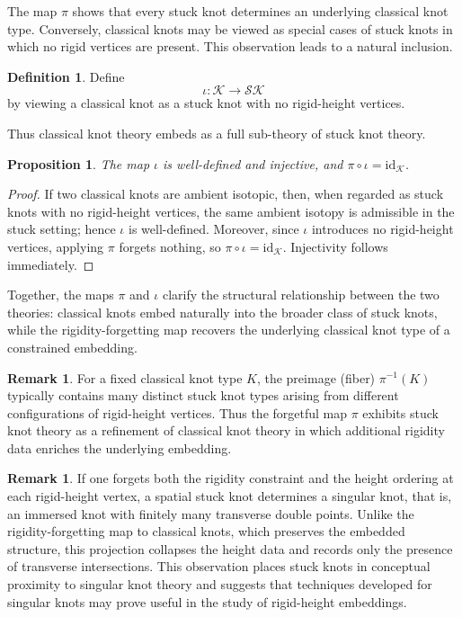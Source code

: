 \documentclass[11pt,a4paper]{article}
\theoremstyle{plain}
\newtheorem{proposition}[theorem]{Proposition}
\theoremstyle{definition}
\newtheorem{definition}[theorem]{Definition}
\newtheorem{remark}[theorem]{Remark}
\begin{document}
The map $\pi$ shows that every stuck knot determines an underlying classical knot type. Conversely, classical knots may be viewed as special cases of stuck knots in which no rigid vertices are present. This observation leads to a natural inclusion.


\begin{definition}
Define
\[
\iota:\mathcal{K}\to\mathcal{SK}
\]
by viewing a classical knot as a stuck knot with no rigid-height vertices.
\end{definition}

Thus classical knot theory embeds as a full sub-theory of stuck knot theory.

\begin{proposition}
The map $\iota$ is well-defined and injective, and $\pi\circ\iota=\mathrm{id}_{\mathcal{K}}$.
\end{proposition}

\begin{proof}
If two classical knots are ambient isotopic, then, when regarded as stuck knots with no rigid-height vertices, the same ambient isotopy is admissible in the stuck setting; hence $\iota$ is well-defined. Moreover, since $\iota$ introduces no rigid-height vertices, applying $\pi$ forgets nothing, so $\pi\circ\iota=\mathrm{id}_{\mathcal{K}}$. Injectivity follows immediately.
\end{proof}

Together, the maps $\pi$ and $\iota$ clarify the structural relationship between the two theories: classical knots embed naturally into the broader class of stuck knots, while the rigidity-forgetting map recovers the underlying classical knot type of a constrained embedding.


\begin{remark}
For a fixed classical knot type $K$, the preimage (fiber) $\pi^{-1}(K)$ typically contains many distinct stuck knot types arising from different configurations of rigid-height vertices. Thus the forgetful map $\pi$ exhibits stuck knot theory as a refinement of classical knot theory in which additional rigidity data enriches the underlying embedding.
\end{remark}


\begin{remark}
If one forgets both the rigidity constraint and the height ordering at each rigid-height vertex, a spatial stuck knot determines a singular knot, that is, an immersed knot with finitely many transverse double points. Unlike the rigidity-forgetting map to classical knots, which preserves the embedded structure, this projection collapses the height data and records only the presence of transverse intersections. This observation places stuck knots in conceptual proximity to singular knot theory and suggests that techniques developed for singular knots may prove useful in the study of rigid-height embeddings.
\end{remark}
\end{document}
